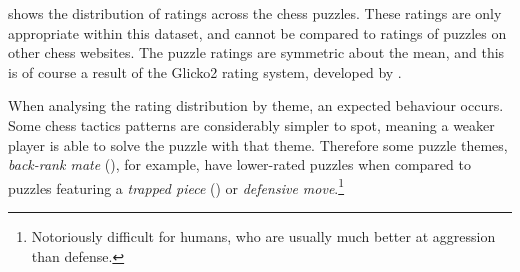  shows the distribution of ratings across the chess
puzzles. These ratings are only appropriate within this dataset, and cannot be
compared to ratings of puzzles on other chess websites. The puzzle ratings are
symmetric about the mean, and this is of course a result of the Glicko2 rating
system, developed by \citet{glicko}.

When analysing the rating distribution by theme, an expected behaviour occurs.
Some chess tactics patterns are considerably simpler to spot, meaning a weaker
player is able to solve the puzzle with that theme. Therefore some puzzle
themes, \emph{back-rank mate} (), for example, have lower-rated
puzzles when compared to puzzles featuring a \emph{trapped piece}
() or \emph{defensive move}.\footnote{Notoriously difficult for
humans, who are usually much better at aggression than
defense.\footnotemark}


